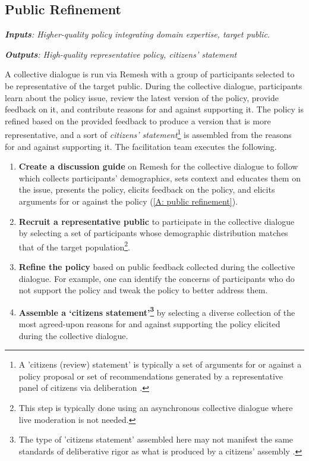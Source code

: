 \documentclass{article}
\begin{document}
\subsection{Public Refinement}

\begin{tcolorbox}[colback=blue!5!white,colframe=blue!30!white]
\emph{\textbf{Inputs}: Higher-quality policy integrating domain expertise, target public.}

\emph{\textbf{Outputs}: High-quality representative policy, citizens’ statement}
\end{tcolorbox}


A collective dialogue is run via Remesh with a group of participants selected to be representative of the target public. During the collective dialogue, participants learn about the policy issue, review the latest version of the policy, provide feedback on it, and contribute reasons for and against supporting it. The policy is refined based on the provided feedback to produce a version that is more representative, and a sort of \emph{citizens' statement}\footnote{A 'citizens (review) statement' is typically a set of arguments for or against a policy proposal or set of recommendations generated by a representative panel of citizens via deliberation \cite{citizens2018}.} is assembled from the reasons for and against supporting it. The facilitation team executes the following.
\begin{enumerate}
    \item \textbf{Create a discussion guide} on Remesh for the collective dialogue to follow which collects participants' demographics, sets context and educates them on the issue, presents the policy, elicits feedback on the policy, and elicits arguments for or against the policy (\ref{A: public refinement}).
    \item \textbf{Recruit a representative public} to participate in the collective dialogue by selecting a set of participants whose demographic distribution matches that of the target population\footnote{This step is typically done using an asynchronous collective dialogue where live moderation is not needed.}. 
    \item \textbf{Refine the policy} based on public feedback collected during the collective dialogue. For example, one can identify the concerns of participants who do not support the policy and tweak the policy to better address them.
    \item \textbf{Assemble a `citizens statement'\footnote{The type of 'citizens statement' assembled here may not manifest the same standards of deliberative rigor as what is produced by a citizens' assembly \cite{citizens2018}.}} by selecting a diverse collection of the most agreed-upon reasons for and against supporting the policy elicited during the collective dialogue. 
\end{enumerate}
\end{document}

